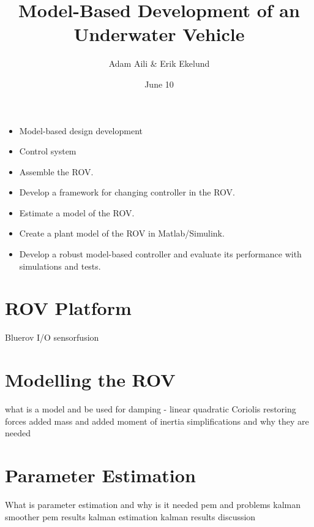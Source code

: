 \documentclass[11pt]{beamer}
\author{Adam Aili \& Erik Ekelund}
\title{Model-Based Development of an Underwater Vehicle}
\date{June 10}
\begin{document}
\begin{frame}
\titlepage
\end{frame}
\begin{frame}
\begin{itemize}
\item Model-based design development
\item Control system
\end{itemize}
\end{frame}

\begin{frame}
\begin{itemize}
\item Assemble the ROV.
\item Develop a framework for changing controller in the ROV.
\item Estimate a model of the ROV.
\item Create a plant model of the ROV in Matlab/Simulink.
\item Develop a robust model-based controller and evaluate its performance with simulations and tests.
\end{itemize}
\end{frame}


\section{ROV Platform}
\begin{frame}
Bluerov
I/O
sensorfusion
\end{frame}
\section{Modelling the ROV}
\begin{frame}
what is a model and be used for
damping - linear quadratic
Coriolis
restoring forces
added mass and added moment of inertia
simplifications and why they are needed
\end{frame}
\section{Parameter Estimation}
\begin{frame}
What is parameter estimation and why is it needed
pem and problems
kalman smoother
pem results
kalman estimation
kalman results
discussion
\end{frame}
\end{document}

